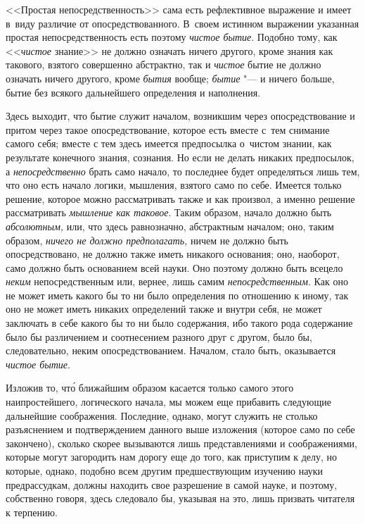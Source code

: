 <<Простая непосредственность>> сама есть рефлективное выражение и имеет в~виду
различие от опосредствованного. В~своем истинном выражении указанная простая
непосредственность есть поэтому {\em чистое бытие}. Подобно тому, как
<<{\em чистое} знание>> не должно означать ничего другого, кроме знания как
такового, взятого совершенно абстрактно, так и {\em чистое} бытие не должно
означать ничего другого, кроме {\em бытия} вообще; {\em бытие} "--- и ничего
больше, бытие без всякого дальнейшего определения и наполнения.

Здесь выходит, что бытие служит началом, возникшим через опосредствование и
притом через такое опосредствование, которое есть вместе с~тем снимание
самого себя; вместе с тем здесь имеется предпосылка о~чистом знании, как
результате конечного знания, сознания. Но если не делать никаких
предпосылок, а {\em непосредственно} брать само начало,
то последнее будет определяться лишь тем, что оно есть начало логики,
мышления, взятого само по себе. Имеется только решение, которое можно
рассматривать также и как произвол, а именно решение рассматривать
{\em мышление как таковое}. Таким образом, начало должно
быть {\em абсолютным,} или, что здесь равнозначно,
абстрактным началом; оно, таким образом, {\em ничего не должно предполагать,}
ничем не должно быть опосредствовано, не должно также
иметь никакого основания; оно, наоборот, само должно быть основанием всей
науки. Оно поэтому должно быть всецело {\em неким} непосредственным или,
вернее, лишь самим {\em непосредственным}. Как оно не может иметь какого
бы то ни было определения по отношению к иному, так оно не может иметь
никаких определений также и внутри себя, не может заключать в себе какого
бы то ни было содержания, ибо такого рода содержание было бы различением и
соотнесением разного друг с другом, было бы, следовательно, неким
опосредствованием. Началом, стало быть, оказывается {\em чистое бытие}.

Изложив то, чт\'{о} ближайшим образом касается только самого этого
наипростейшего, логического начала, мы можем еще прибавить следующие дальнейшие
соображения. Последние, однако, могут служить не столько разъяснением и
подтверждением данного выше изложения (которое само по себе закончено), сколько
скорее вызываются лишь представлениями и соображениями, которые могут
загородить нам дорогу еще до того, как приступим к делу, но которые, однако,
подобно всем другим предшествующим изучению науки предрассудкам, должны
находить свое разрешение в самой науке, и поэтому, собственно говоря, здесь
следовало бы, указывая на это, лишь призвать читателя к терпению.

